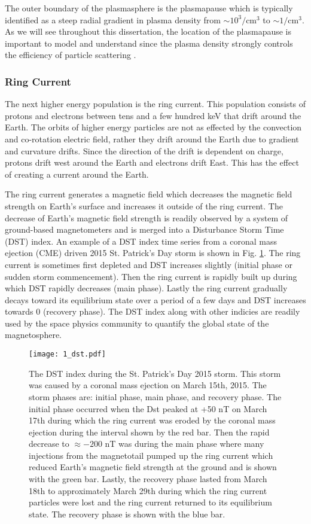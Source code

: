 The outer boundary of the plasmasphere is the plasmapause which is typically identified as a steep radial gradient in plasma density from $\sim 10^3 / \mathrm{cm}^3$ to $\sim 1 / \mathrm{cm}^3$. As we will see throughout this dissertation, the location of the plasmapause is important to model \citep[e.g.][]{O'Brien2003empirical} and understand since the plasma density strongly controls the efficiency of particle scattering \citep{Horne2005}.

\subsubsection{Ring Current}
The next higher energy population is the ring current. This population consists of protons and electrons between tens and a few hundred keV that drift around the Earth. The orbits of higher energy particles are not as effected by the convection and co-rotation electric field, rather they drift around the Earth due to gradient and curvature drifts. Since the direction of the drift is dependent on charge, protons drift west around the Earth and electrons drift East. This has the effect of creating a current around the Earth. 

The ring current generates a magnetic field which decreases the magnetic field strength on Earth's surface and increases it outside of the ring current. The decrease of Earth's magnetic field strength is readily observed by a system of ground-based magnetometers and is merged into a Disturbance Storm Time (DST) index. An example of a DST index time series from a coronal mass ejection (CME) driven 2015 St. Patrick's Day storm is shown in Fig. \ref{Intro:dst}. The ring current is sometimes first depleted and DST increases slightly (initial phase or sudden storm commencement). Then the ring current is rapidly built up during which DST rapidly decreases (main phase). Lastly the ring current gradually decays toward its equilibrium state over a period of a few days and DST increases towards 0 (recovery phase). The DST index along with other indicies are readily used by the space physics community to quantify the global state of the magnetosphere.

\begin{figure}
\texttt{[image: 1\_dst.pdf]}
\caption{The DST index during the St. Patrick's Day 2015 storm. This storm was caused by a coronal mass ejection on March 15th, 2015. The storm phases are: initial phase, main phase, and recovery phase. The initial phase occurred when the Dst peaked at +50 nT on March 17th during which the ring current was eroded by the coronal mass ejection during the interval shown by the red bar. Then the rapid decrease to $\approx -200$ nT was during the main phase where many injections from the magnetotail pumped up the ring current which reduced Earth's magnetic field strength at the ground and is shown with the green bar. Lastly, the recovery phase lasted from March 18th to approximately March 29th during which the ring current particles were lost and the ring current returned to its equilibrium state. The recovery phase is shown with the blue bar.}
\label{Intro:dst}
\end{figure}

